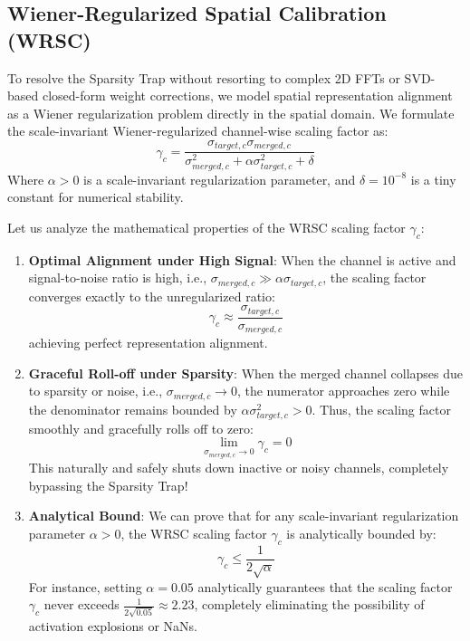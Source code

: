 \documentclass{article}
\theoremstyle{plain}
\theoremstyle{definition}
\theoremstyle{remark}
\begin{document}
\subsection{Wiener-Regularized Spatial Calibration (WRSC)}
To resolve the Sparsity Trap without resorting to complex 2D FFTs or SVD-based closed-form weight corrections, we model spatial representation alignment as a Wiener regularization problem directly in the spatial domain.
We formulate the scale-invariant Wiener-regularized channel-wise scaling factor as:
\begin{equation}
\gamma_{c} = \frac{\sigma_{target, c} \sigma_{merged, c}}{\sigma_{merged, c}^2 + \alpha \sigma_{target, c}^2 + \delta}
\end{equation}
Where $\alpha > 0$ is a scale-invariant regularization parameter, and $\delta = 10^{-8}$ is a tiny constant for numerical stability.

Let us analyze the mathematical properties of the WRSC scaling factor $\gamma_c$:
\begin{enumerate}
    \item \textbf{Optimal Alignment under High Signal}: When the channel is active and signal-to-noise ratio is high, i.e., $\sigma_{merged, c} \gg \alpha \sigma_{target, c}$, the scaling factor converges exactly to the unregularized ratio:
    \begin{equation}
    \gamma_c \approx \frac{\sigma_{target, c}}{\sigma_{merged, c}}
    \end{equation}
    achieving perfect representation alignment.
    \item \textbf{Graceful Roll-off under Sparsity}: When the merged channel collapses due to sparsity or noise, i.e., $\sigma_{merged, c} \to 0$, the numerator approaches zero while the denominator remains bounded by $\alpha \sigma_{target, c}^2 > 0$. Thus, the scaling factor smoothly and gracefully rolls off to zero:
    \begin{equation}
    \lim_{\sigma_{merged, c} \to 0} \gamma_c = 0
    \end{equation}
    This naturally and safely shuts down inactive or noisy channels, completely bypassing the Sparsity Trap!
    \item \textbf{Analytical Bound}: We can prove that for any scale-invariant regularization parameter $\alpha > 0$, the WRSC scaling factor $\gamma_c$ is analytically bounded by:
    \begin{equation}
    \gamma_c \le \frac{1}{2\sqrt{\alpha}}
    \end{equation}
    For instance, setting $\alpha = 0.05$ analytically guarantees that the scaling factor $\gamma_c$ never exceeds $\frac{1}{2\sqrt{0.05}} \approx 2.23$, completely eliminating the possibility of activation explosions or NaNs.
\end{enumerate}
\end{document}
